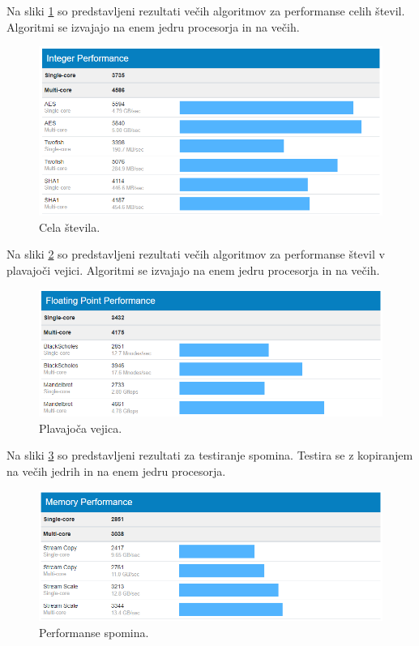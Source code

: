Na sliki \ref{fig:1_geekbench1} so predstavljeni rezultati večih algoritmov za performanse celih števil. Algoritmi se izvajajo na enem jedru procesorja in na večih.
\begin{figure}[H]
    \centering
    \includegraphics[scale=0.5]{Img/geekbench1.png}
    \caption{Cela števila.}
    \label{fig:1_geekbench1}
\end{figure} Na sliki \ref{fig:2_geekbench2} so predstavljeni rezultati večih algoritmov za performanse števil v plavajoči vejici. Algoritmi se izvajajo na enem jedru procesorja in na večih.
\begin{figure}[H]
    \centering
    \includegraphics[scale=0.5]{Img/geekbench2.png}
    \caption{Plavajoča vejica.}
    \label{fig:2_geekbench2}
\end{figure} Na sliki \ref{fig:3_geekbench3} so predstavljeni rezultati za testiranje spomina. Testira se z kopiranjem na večih jedrih in na enem jedru procesorja.
\begin{figure}[H]
    \centering
    \includegraphics[scale=0.5]{Img/geekbench3.png}
    \caption{Performanse spomina.}
    \label{fig:3_geekbench3}
\end{figure}

